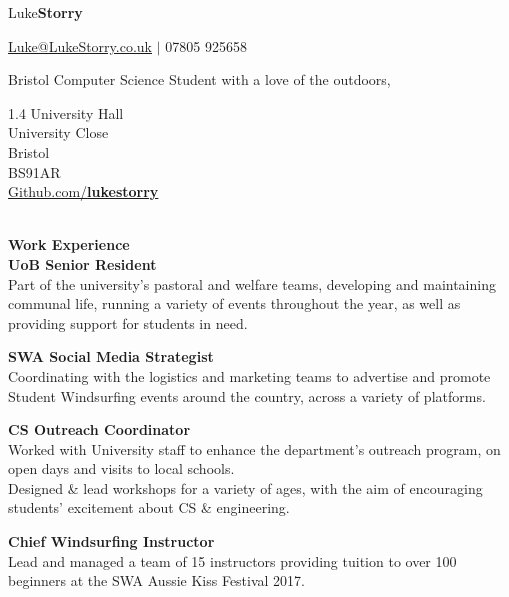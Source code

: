 \documentclass[10pt]{article}
\newcommand{\sect}[1]{{\LARGE{\textbf{#1}}}\vspace{0.1em}\\}
\newcommand{\xx}[2]{{\large\textbf{#1}}\\{#2}\vspace{0.5em}}
\begin{document}
\begin{center}
{\Huge{{Luke}\textbf{Storry}}}
\hspace{0.1em}

{\large \href{mailto:Luke@LukeStorry.co.uk}{Luke@LukeStorry.co.uk}  $|$  07805 925658} 
\hspace{0.1em}

Bristol Computer Science Student with a love of the outdoors, 

{\textcolor{linecol}\hrulefill}
\end{center}
%
%
%
%
%
%
\begin{minipage}[t]{0.33\textwidth} %
1.4 University Hall\\University Close\\Bristol\\BS91AR
\vspace{0.5em}\\
\href{https://github.com/lukestorry}{Github.com/\textbf{lukestorry}} \\
\\
\raggedright
\sect{Work Experience}
\xx{UoB Senior Resident}
{Part of the university's pastoral and welfare teams, developing and maintaining communal life, running a variety of events throughout the year, as well as providing support for students in need.}

\xx{SWA Social Media Strategist}
{Coordinating with the logistics and marketing teams to advertise and promote Student Windsurfing events around the country, across a variety of platforms.}

\xx{CS Outreach Coordinator}{Worked with University staff to enhance the department's outreach program, on open days and visits to local schools. \\
Designed \& lead workshops for a variety of ages, with the aim of encouraging students' excitement about CS \& engineering.}

\xx{Chief Windsurfing Instructor}
{Lead and managed a team of 15 instructors providing tuition to over 100 beginners at the SWA Aussie Kiss Festival 2017.}


\end{minipage}
\end{document}
